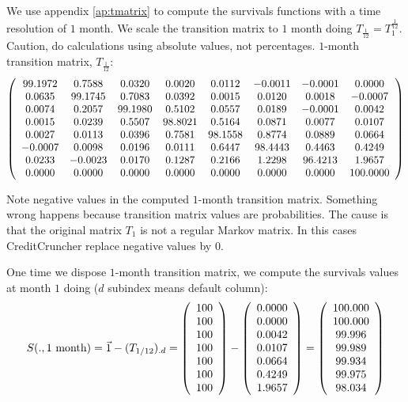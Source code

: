 \documentclass[a4paper,12pt,final]{article}
\begin{document}
We use appendix \ref{ap:tmatrix} to compute the survivals functions 
with a time resolution of $1$ month. We scale the transition matrix 
to $1$ month doing $T_{\frac{1}{12}} = T_{1}^{\frac{1}{12}}$. Caution, 
do calculations using absolute values, not percentages. $1$-month 
transition matrix, $T_{\frac{1}{12}}$:
{\small
\begin{displaymath}
\left( 
\begin{array}{cccccccc}
    99.1972  &   0.7588  &   0.0320  &   0.0020  &   0.0112  &  -0.0011  &  -0.0001  &   0.0000  \cr
     0.0635  &  99.1745  &   0.7083  &   0.0392  &   0.0015  &   0.0120  &   0.0018  &  -0.0007  \cr
     0.0074  &   0.2057  &  99.1980  &   0.5102  &   0.0557  &   0.0189  &  -0.0001  &   0.0042  \cr
     0.0015  &   0.0239  &   0.5507  &  98.8021  &   0.5164  &   0.0871  &   0.0077  &   0.0107  \cr
     0.0027  &   0.0113  &   0.0396  &   0.7581  &  98.1558  &   0.8774  &   0.0889  &   0.0664  \cr
    -0.0007  &   0.0098  &   0.0196  &   0.0111  &   0.6447  &  98.4443  &   0.4463  &   0.4249  \cr
     0.0233  &  -0.0023  &   0.0170  &   0.1287  &   0.2166  &   1.2298  &  96.4213  &   1.9657  \cr
     0.0000  &   0.0000  &   0.0000  &   0.0000  &   0.0000  &   0.0000  &   0.0000  & 100.0000 
\end{array}
\right)
\end{displaymath}
}

Note negative values in the computed $1$-month transition matrix. Something wrong happens 
because transition matrix values are probabilities. The cause is that the original matrix 
$T_1$ is not a regular Markov matrix. In this cases CreditCruncher replace negative 
values by $0$.
\newline

One time we dispose $1$-month transition matrix, we compute the survivals
values at month $1$ doing ($d$ subindex means default column):
\begin{displaymath}
S(.,1 \textrm{ month}) = \vec{1} - (T_{1/12})_{.d} = 
\left( 
\begin{array}{c}
 100 \cr
 100 \cr
 100 \cr
 100 \cr
 100 \cr
 100 \cr
 100
\end{array}
\right)
 - 
\left( 
\begin{array}{c}
 0.0000 \cr
 0.0000 \cr
 0.0042 \cr
 0.0107 \cr
 0.0664 \cr
 0.4249 \cr
 1.9657
\end{array}
\right)
=
\left( 
\begin{array}{c}
 100.000 \cr
 100.000 \cr
  99.996 \cr
  99.989 \cr
  99.934 \cr
  99.975 \cr
  98.034 
\end{array}
\right)
\end{displaymath}
\end{document}
